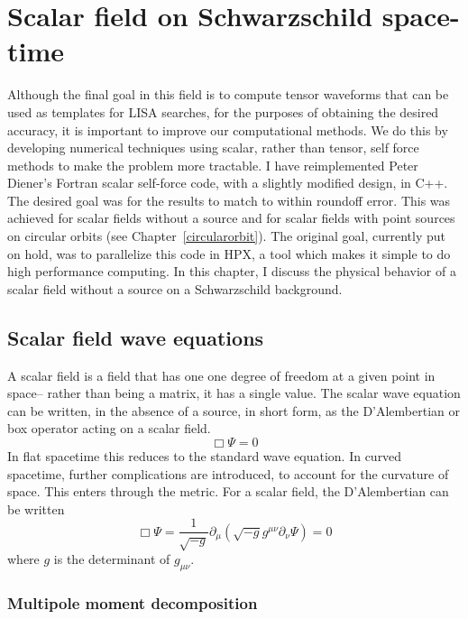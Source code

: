 \section{Scalar field on Schwarzschild space-time}
Although the final goal in this field is to compute tensor waveforms that can be used as templates for LISA searches, for the purposes of obtaining the desired accuracy, it is important to improve our computational methods. We do this by developing numerical techniques using scalar, rather than tensor, self force methods to make the problem more tractable. I have reimplemented Peter Diener's Fortran scalar self-force code, with a slightly modified design, in C++. The desired goal was for the results to match to within roundoff error. This was achieved for scalar fields without a source and for scalar fields with point sources on circular orbits (see Chapter~\ref{circularorbit}). The original goal, currently put on hold, was to parallelize this code in HPX, a tool which makes it simple to do high performance computing. In this chapter, I discuss the physical behavior of a scalar field without a source on a Schwarzschild background. 


\subsection{Scalar field wave equations}
A scalar field is a field that has one one degree of freedom at a given point in space-- rather than being a matrix, it has a single value. The scalar wave equation can be written, in the absence of a source, in short form, as the D'Alembertian or box operator acting on a scalar field. 
\begin{equation}
  \Box\Psi=0
\end{equation}
In flat spacetime this reduces to the standard wave equation. In curved spacetime, further complications are introduced, to account for the curvature of space. This enters through the metric. For a scalar field, the D'Alembertian can be written
\begin{equation}
  \Box\Psi=\frac{1}{\sqrt{-g}}\partial_\mu(\sqrt{-g}g^{\mu\nu}\partial_\nu\Psi)=0
\end{equation}
where $g$ is the determinant of $g_{\mu\nu}$.~\cite{Wald} 

\subsubsection{Multipole moment decomposition}

